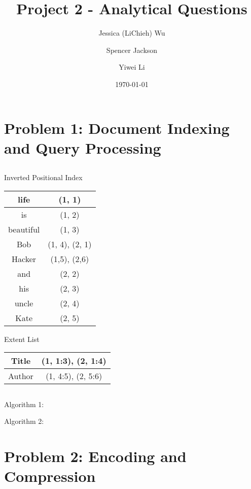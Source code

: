 \documentclass{article}
\begin{document}
\title{Project 2 - Analytical Questions}
\author{Jessica (LiChieh) Wu \and Spencer Jackson \and Yiwei Li}
\date{\today}
\maketitle


\section{Problem 1: Document Indexing and Query Processing}
\subsection{}
Inverted Positional Index
\begin{table}[h]
\begin{tabular}{|c|c|}
\hline
life & (1, 1)\\
\hline
is & (1, 2)\\
\hline
beautiful & (1, 3)\\
\hline
Bob & (1, 4), (2, 1)\\
\hline
Hacker & (1,5), (2,6)\\
\hline
and & (2, 2)\\
\hline
his & (2, 3)\\
\hline
uncle & (2, 4)\\
\hline
Kate & (2, 5)\\
\hline
\end{tabular}
\end{table}

\noindent
Extent List
\begin{table}[h]
\begin{tabular}{|c|c|}
\hline
Title & (1, 1:3), (2, 1:4)\\
\hline
Author & (1, 4:5), (2, 5:6)\\
\hline
\end{tabular}
\end{table}

\subsection{}
Algorithm 1:

\noindent
Algorithm 2:

\section{Problem 2: Encoding and Compression}
\subsection{}
\end{document}

